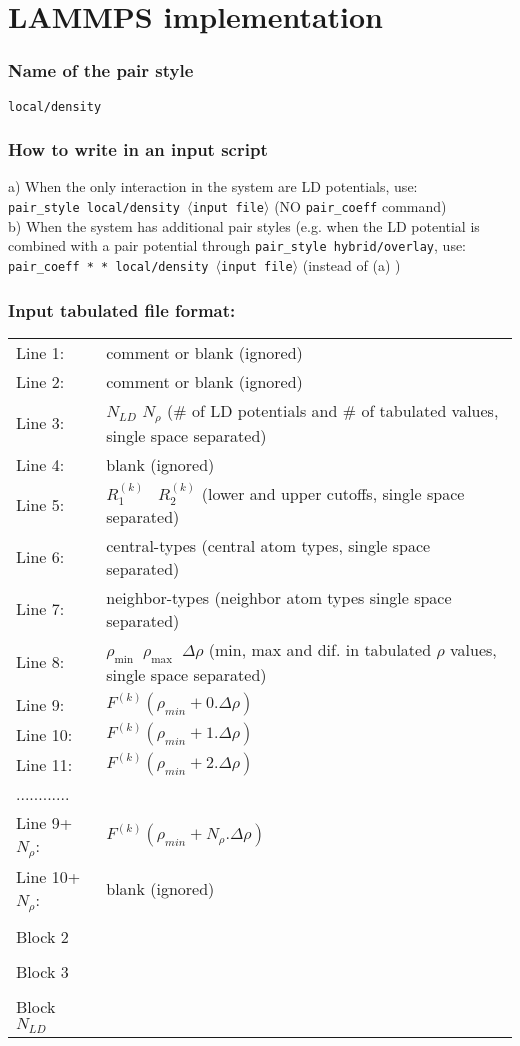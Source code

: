 \documentclass[12pt,a4paper]{article}
\begin{document}
\section*{LAMMPS implementation}
\subsubsection*{Name of the pair style}
\texttt{local/density}
%
\subsubsection*{How to write in an input script}
a) When the only interaction in the system are LD potentials, use:\\
\texttt{pair\_style local/density $\langle$input file$\rangle$} (NO \texttt{pair\_coeff} command)\\

\noindent b) When the system has additional pair styles (e.g. when the LD potential is combined with a pair potential through \texttt{pair\_style hybrid/overlay}, use:\\
\texttt{pair\_coeff *  * local/density $\langle$input file$\rangle$} (instead of (a) )

\subsubsection*{Input tabulated file format:}
\begin{tabular}{l l}
Line 1:   & comment or blank (ignored)\\
Line 2:  & comment or blank (ignored)\\
Line 3:  & $N_{LD}$ $N_{\rho}$ (\# of LD potentials and \# of tabulated values, single space separated)\\
Line 4:  & blank (ignored)\\
Line 5:  & $R_1^{(k)} \; \; \; R_2^{(k)}$ (lower and upper cutoffs, single space separated)\\
Line 6: 	& central-types (central atom types, single space separated)\\
Line 7: 	& neighbor-types (neighbor atom types single space separated)\\
Line 8: 	& $\rho_{\mathrm{min}} \; \; \rho_{\mathrm{max}} \; \; \Delta \rho$ (min, max and dif. in tabulated $\rho$ values, single space separated)\\
Line 9: 	& $F^{(k)}(\rho_{min} + 0.\Delta \rho)$\\
Line 10:	& $F^{(k)}(\rho_{min} + 1.\Delta \rho)$\\
Line 11:	& $F^{(k)}(\rho_{min} + 2.\Delta \rho)$\\
............& { }\\
Line 9+$N_\rho$: &  $F^{(k)}(\rho_{min} + N_\rho . \Delta \rho)$\\	
Line 10+$N_\rho$: & blank (ignored)\\
\\
Block 2 & { }\\
\\
Block 3 & { }\\
\\
Block $N_{LD}$ & { }
\end{tabular}
\\
\end{document}

